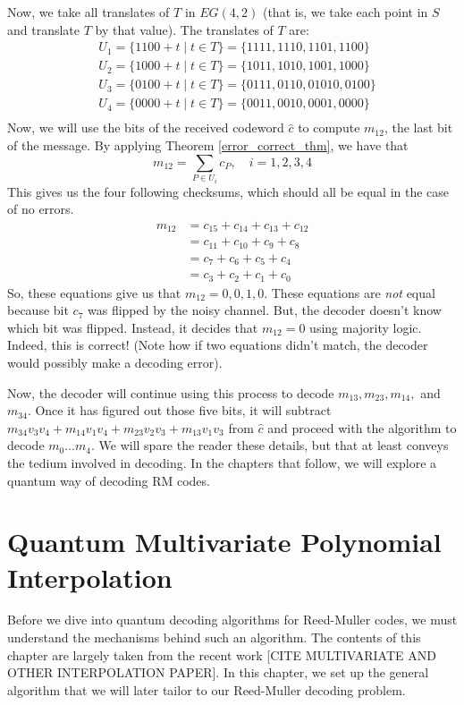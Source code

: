 \documentclass[12pt,twoside]{reedthesis}
\theoremstyle{definition}
\begin{document}
Now, we take all translates of $T$ in $EG(4,2)$ (that is, we take each point in $S$ and translate $T$ by that value). The translates of $T$ are: 
\begin{align*}
& U_1 =  \{1100 + t \mid t \in T\} = \{1111, 1110, 1101, 1100\} \\
& U_2 = \{1000 + t \mid t \in T\} = \{1011, 1010, 1001, 1000\} \\
& U_3 = \{0100 + t \mid t \in T\} = \{0111, 0110, 01010, 0100\} \\
& U_4 =  \{0000 + t \mid t \in T\} = \{0011, 0010, 0001, 0000\} \\
\end{align*}
Now, we will use the bits of the received codeword $\hat{c}$ to compute $m_{12}$, the last bit of the message. By applying Theorem \ref{error_correct_thm}, we have that 
\begin{equation*}
m_{12}  = \sum_{P \in U_i} c_P, \quad i = 1,2,3,4 
\end{equation*}
This gives us the four following checksums, which should all be equal in the case of no errors.
\begin{align*}
 m_{12} 
& = c_{15} + c_{14} + c_{13} + c_{12}\\
& = c_{11} + c_{10} + c_{9} + c_{8}\\
& = c_{7} + c_{6} + c_{5} + c_{4} \\
& = c_{3} + c_2 + c_1 + c_0
\end{align*}
So, these equations give us that $m_{12} =0,0,1,0 $. These equations are \textit{not} equal because bit $c_7$ was flipped by the noisy channel. But, the decoder doesn't know which bit was flipped. Instead, it decides that $m_{12} = 0$ using majority logic. Indeed, this is correct! (Note how if two equations didn't match, the decoder would possibly make a decoding error).

Now, the decoder will continue using this process to decode $m_{13}, m_{23}, m_{14}, $ and $m_{34}$. Once it has figured out those five bits, it will subtract $m_{34}v_3v_4 + m_{14}v_1v_4 + m_{23}v_2v_3 + m_{13}v_1v_3$ from $\hat{c}$ and proceed with the algorithm to decode $m_0 \ldots m_4$. We will spare the reader these details, but that at least conveys the tedium involved in decoding. In the chapters that follow, we will explore a quantum way of decoding RM codes.

\chapter{Quantum Multivariate Polynomial Interpolation}
Before we dive into quantum decoding algorithms for Reed-Muller codes, we must understand the mechanisms behind such an algorithm. The contents of this chapter are largely taken from the recent work [CITE MULTIVARIATE AND OTHER INTERPOLATION PAPER]. In this chapter, we set up the general algorithm that we will later tailor to our Reed-Muller decoding problem. 
\end{document}
